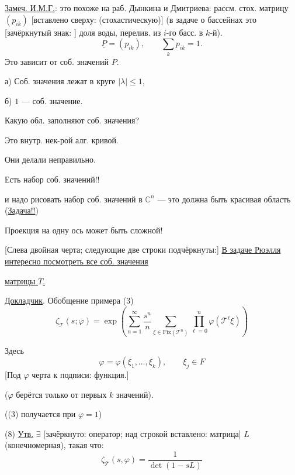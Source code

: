 \underline{Замеч. И.М.Г.}: это похоже на раб. Дынкина и Дмитриева:
рассм. стох. матрицу $(p_{ik})$ [вставлено сверху: (стохастическую)]
(в задаче о бассейнах это
[зачёркнутый знак: ]
доля воды, перелив. из $i$-го басс. в $k$-й).
\begin{equation*}
 \underline{P}=(p_{ik}),\qquad \sum_k p_{ik}=1.
\end{equation*}
Это зависит от соб. значений $P$.

а) Соб. значения лежат в круге $|\lambda|\leq1$,

б) $1$ — соб. значение.

Какую обл. заполняют соб. значения?

Это внутр. нек-рой алг. кривой.

Они делали неправильно.

Есть набор соб. значений!!

и надо рисовать набор соб. значений в $\mathbb C^n$ — это должна
быть красивая область (\underline{Задача!!})

Проекция на одну ось может быть сложной!

[Слева двойная черта; следующие две строки подчёркнуты:]
\underline{В задаче Рюэлля интересно посмотреть все соб. значения}

\underline{матрицы $T$.}

\medskip
\underline{Докладчик}. Обобщение примера (3)
\begin{equation}
 \zeta_{\mathcal T}(s;\varphi)=
 \exp\left(
 \sum_{n=1}^{\infty}\frac{s^n}{n}
 \sum_{\xi\in\mathrm{Fix}(\mathcal T^n)}
 \prod_{\ell=0}^{n}\varphi(\mathcal T^\ell\xi)
 \right)
 \tag{7}
\end{equation}

Здесь
\begin{equation*}
 \varphi=\varphi(\xi_1,\ldots,\xi_k),\qquad \xi_j\in F
\end{equation*}
[Под $\varphi$ черта к подписи: функция.]

($\varphi$ берётся только от первых $k$ значений).

((3) получается при $\varphi=1$)

(8) \underline{Утв.} $\exists$ [зачёркнуто: оператор; над строкой вставлено: матрица]
$L$ (конечномерная), такая что:
\begin{equation}
 \zeta_{\mathcal T}(s,\varphi)=\frac{1}{\det(1-sL)}
 \tag{9}
\end{equation}

